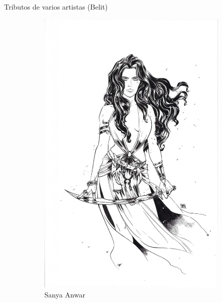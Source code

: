 \begin{frame}{Tributos de varios artistas (Belit)}
	\begin{figure}[htp]
		\centering
		\begin{subfigure}[b]{0.22\textwidth}
			\includegraphics[width=\textwidth]{img/tributos/SanyaAnwar}
			\caption{Sanya Anwar}
		\end{subfigure}
		~
		\begin{subfigure}[b]{0.22\textwidth}

\end{subfigure}
\end{figure}
\end{frame}
